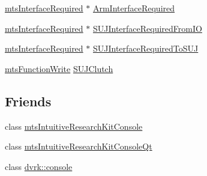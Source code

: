 \begin{DoxyCompactItemize}
\item 
\hyperlink{classmts_interface_required}{mts\-Interface\-Required} $\ast$ \hyperlink{classmts_intuitive_research_kit_console_1_1_arm_af07356a6f1c70f87950c96852d84e56c}{Arm\-Interface\-Required}
\item 
\hyperlink{classmts_interface_required}{mts\-Interface\-Required} $\ast$ \hyperlink{classmts_intuitive_research_kit_console_1_1_arm_a0a53995fe8138c22a4240b76c2d660f9}{S\-U\-J\-Interface\-Required\-From\-I\-O}
\item 
\hyperlink{classmts_interface_required}{mts\-Interface\-Required} $\ast$ \hyperlink{classmts_intuitive_research_kit_console_1_1_arm_a42263c728ca5e3283d74330cdae3aeb7}{S\-U\-J\-Interface\-Required\-To\-S\-U\-J}
\item 
\hyperlink{classmts_function_write}{mts\-Function\-Write} \hyperlink{classmts_intuitive_research_kit_console_1_1_arm_a163b24d4aa7e617d62aed506066ef506}{S\-U\-J\-Clutch}
\end{DoxyCompactItemize}
\subsection*{Friends}
\begin{DoxyCompactItemize}
\item 
class \hyperlink{classmts_intuitive_research_kit_console_1_1_arm_a6e35490bedd0064dfeec97d358594b90}{mts\-Intuitive\-Research\-Kit\-Console}
\item 
class \hyperlink{classmts_intuitive_research_kit_console_1_1_arm_a9cbd14ff7aa15c6b787a1640dd0a598b}{mts\-Intuitive\-Research\-Kit\-Console\-Qt}
\item 
class \hyperlink{classmts_intuitive_research_kit_console_1_1_arm_a30eecdaed2d925aff1a8ca2341429a2d}{dvrk\-::console}
\end{DoxyCompactItemize}


